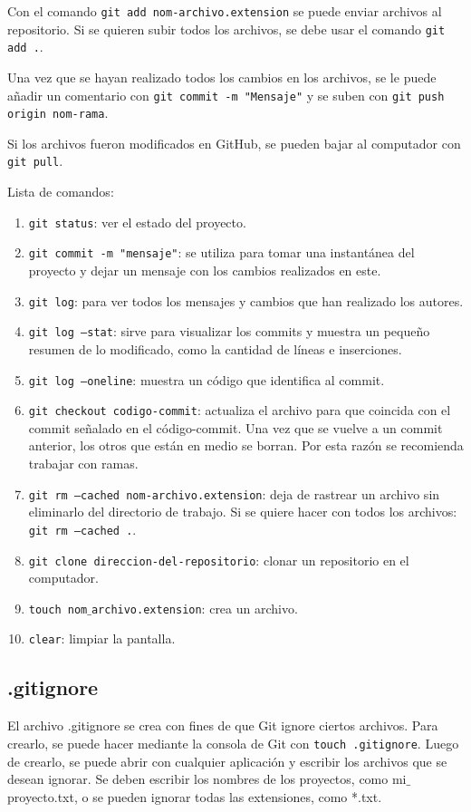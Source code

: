 \documentclass[a4paper, 12pt]{book}
\begin{document}
Con el comando \texttt{git add nom-archivo.extension} se puede enviar archivos al repositorio. Si se quieren subir todos los archivos, se debe usar el comando \texttt{git add .}.

Una vez que se hayan realizado todos los cambios en los archivos, se le puede añadir un comentario con \texttt{git commit -m "Mensaje"} y se suben con \texttt{git push origin nom-rama}.

Si los archivos fueron modificados en GitHub, se pueden bajar al computador con \texttt{git pull}.

Lista de comandos: 
\begin{enumerate}
\item \texttt{git status}: ver el estado del proyecto.
\item \texttt{git commit -m "mensaje"}: se utiliza para tomar una instantánea del proyecto y dejar un mensaje con los cambios realizados en este.
\item \texttt{git log}: para ver todos los mensajes y cambios que han realizado los autores.
\item \texttt{git log --stat}: sirve para visualizar los commits y muestra un pequeño resumen de lo modificado, como la cantidad de líneas e inserciones.
\item \texttt{git log --oneline}: muestra un código que identifica al commit.
\item \texttt{git checkout codigo-commit}: actualiza el archivo para que coincida con el commit señalado en el código-commit. Una vez que se vuelve a un commit anterior, los otros que están en medio se borran. Por esta razón se recomienda trabajar con ramas.
\item \texttt{git rm --cached nom-archivo.extension}: deja de rastrear un archivo sin eliminarlo del directorio de trabajo. Si se quiere hacer con todos los archivos: \texttt{git rm --cached .}.
\item \texttt{git clone direccion-del-repositorio}: clonar un repositorio en el computador.
\item \texttt{touch nom$\_$archivo.extension}: crea un archivo.
\item \texttt{clear}: limpiar la pantalla.
\end{enumerate}
\subsection{.gitignore}
El archivo .gitignore se crea con fines de que Git ignore ciertos archivos. Para crearlo, se puede hacer mediante la consola de Git con \texttt{touch .gitignore}. Luego de crearlo, se puede abrir con cualquier aplicación y escribir los archivos que se desean ignorar. Se deben escribir los nombres de los proyectos, como mi$\_$proyecto.txt, o se pueden ignorar todas las extensiones, como *.txt.
\end{document}
